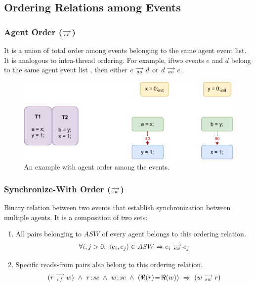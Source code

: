 \subsection{Ordering Relations among Events}
        
    \subsubsection{Agent Order ($\stackrel{\longrightarrow}{_{ao}}$)}
        It is a union of total order among events belonging to the same agent event list. It is analogous to intra-thread ordering. For example, iftwo events $e$ and $d$ belong to the same agent event list , then either $e\stackrel{\longrightarrow}{_{ao}}d$ or $d\stackrel{\longrightarrow}{_{ao}}e$. 
        
        \begin{figure}[H]
            \centering
            \includegraphics[scale=0.7]{ECMAScriptMemoryModel/AgentOrder.pdf}
            \caption{An example with agent order among the events.}
        \end{figure}
    
    \subsubsection{Synchronize-With Order ($\stackrel{\longrightarrow}{_{sw}} $)}
       Binary relation between two events that establish synchronization between multiple agents. It is a composition of two sets: 
        \begin{enumerate}
            \item All pairs belonging to $ASW$ of every agent belongs to this ordering relation. 
                \begin{align*}
                    \forall{i, j > 0}, \ \langle e_i, e_j \rangle \in ASW \Rightarrow{} e_i\stackrel{\longrightarrow}{_{sw}}e_j 
                \end{align*}
                    
            \item Specific reads-from pairs also belong to this ordering relation\footnotemark. 
                \begin{align*}
                    (\reln{r}{rf}{w}) \ \wedge \ \et{r}{sc} \ \wedge \ \et{w}{sc} \ \wedge \ (\Re(r)\!=\!\Re(w)) \ \Rightarrow{} \
                    (\reln{w}{sw}{r})
                \end{align*}
                    
        \end{enumerate}
        
